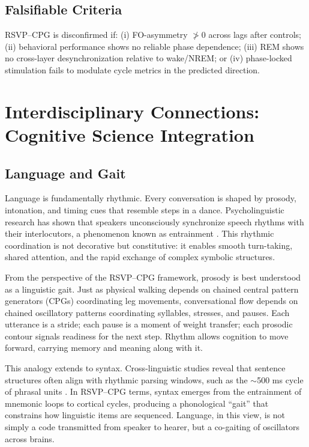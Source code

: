 \documentclass{article}
\begin{document}
\subsection{Falsifiable Criteria}
RSVP--CPG is disconfirmed if: (i) FO-asymmetry $\not>{}0$ across lags after controls; (ii) behavioral performance shows no reliable phase dependence; (iii) REM shows no cross-layer desynchronization relative to wake/NREM; or (iv) phase-locked stimulation fails to modulate cycle metrics in the predicted direction.


\section{Interdisciplinary Connections: Cognitive Science Integration}
\subsection{Language and Gait}

Language is fundamentally rhythmic. Every conversation is shaped by prosody, intonation, and timing cues that resemble steps in a dance. Psycholinguistic research has shown that speakers unconsciously synchronize speech rhythms with their interlocutors, a phenomenon known as entrainment \citep{breska2017neural,levinson2016turn}. This rhythmic coordination is not decorative but constitutive: it enables smooth turn-taking, shared attention, and the rapid exchange of complex symbolic structures.

From the perspective of the RSVP--CPG framework, prosody is best understood as a linguistic gait. Just as physical walking depends on chained central pattern generators (CPGs) coordinating leg movements, conversational flow depends on chained oscillatory patterns coordinating syllables, stresses, and pauses. Each utterance is a stride; each pause is a moment of weight transfer; each prosodic contour signals readiness for the next step. Rhythm allows cognition to move forward, carrying memory and meaning along with it.

This analogy extends to syntax. Cross-linguistic studies reveal that sentence structures often align with rhythmic parsing windows, such as the $\sim$500 ms cycle of phrasal units \citep{ding2016cortical}. In RSVP--CPG terms, syntax emerges from the entrainment of mnemonic loops to cortical cycles, producing a phonological “gait” that constrains how linguistic items are sequenced. Language, in this view, is not simply a code transmitted from speaker to hearer, but a co-gaiting of oscillators across brains.
\end{document}
